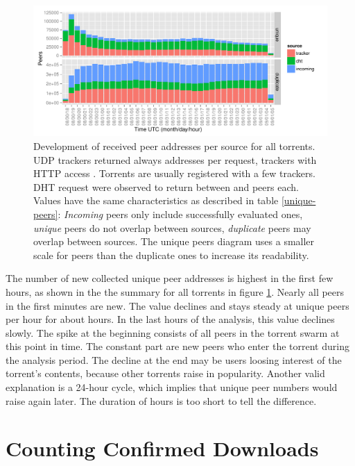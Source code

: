\documentclass[10pt, a4paper, twoside=false, headsepline]{scrbook}
\renewcommand{\_}{\origunderscore\allowbreak}
\begin{document}
\begin{figure}
\centering
\includegraphics[width=\textwidth]{../result/2015-08-30_20-combined_source_all_torrents}
\caption[Development of received peer addresses per source]{Development of received peer addresses per source for all torrents. UDP trackers returned always  addresses per request, trackers with HTTP access . Torrents are usually registered with a few trackers. DHT request were observed to return between  and  peers each. Values have the same characteristics as described in table \ref{unique-peers}: \emph{Incoming} peers only include successfully evaluated ones, \emph{unique} peers do not overlap between sources, \emph{duplicate} peers may overlap between sources. The unique peers diagram uses a smaller scale for peers than the duplicate ones to increase its readability.}
\label{request-history}
\end{figure}

The number of new collected unique peer addresses is highest in the first few hours, as shown in the the summary for all torrents  in figure \ref{request-history}. Nearly all peers in the first  minutes are new. The value declines and stays steady at  unique peers per hour for about  hours. In the last  hours of the analysis, this value declines slowly. The spike at the beginning consists of all peers in the torrent swarm at this point in time. The constant part are new peers who enter the torrent during the analysis period. The decline at the end may be users loosing interest of the torrent's contents, because other torrents raise in popularity. Another valid explanation is a 24-hour cycle, which implies that unique peer numbers would raise again later. The duration of  hours is too short to tell the difference.

\section{Counting Confirmed Downloads}
\end{document}
